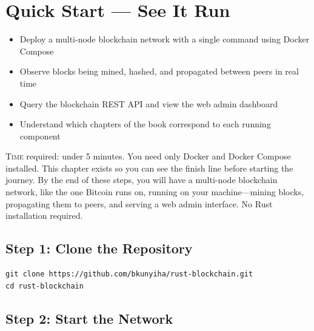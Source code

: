 \chapter{Quick Start --- See It Run}
\label{ch:quickstart}

\begin{learnbox}
\begin{itemize}
  \item Deploy a multi-node blockchain network with a single command using Docker Compose
  \item Observe blocks being mined, hashed, and propagated between peers in real time
  \item Query the blockchain REST API and view the web admin dashboard
  \item Understand which chapters of the book correspond to each running component
\end{itemize}
\end{learnbox}

\lettrine{T}{ime} required: under 5 minutes. You need only Docker and Docker Compose installed.
This chapter exists so you can see the finish line before starting the journey. By the end of these
steps, you will have a multi-node blockchain network, like the one Bitcoin runs on, running on
your machine---mining blocks, propagating them to peers, and serving a web admin interface. No Rust
installation required.

\section{Step 1: Clone the Repository}
\label{sec:step1-clone}

\begin{verbatim}
git clone https://github.com/bkunyiha/rust-blockchain.git
cd rust-blockchain
\end{verbatim}

\section{Step 2: Start the Network}
\label{sec:step2-start}

